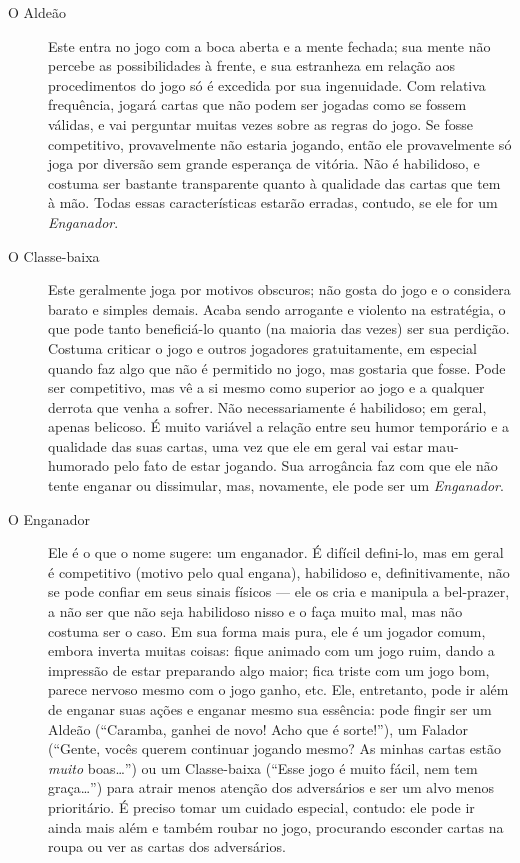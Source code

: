 \begin{description}
\item[O Aldeão]{Este entra no jogo com a boca aberta e a mente fechada; sua mente não percebe as possibilidades à frente, e sua estranheza em relação aos procedimentos do jogo só é excedida por sua ingenuidade. Com relativa frequência, jogará cartas que não podem ser jogadas como se fossem válidas, e vai perguntar muitas vezes sobre as regras do jogo. Se fosse competitivo, provavelmente não estaria jogando, então ele provavelmente só joga por diversão sem grande esperança de vitória. Não é habilidoso, e costuma ser bastante transparente quanto à qualidade das cartas que tem à mão. Todas essas características estarão erradas, contudo, se ele for um \textit{Enganador}.}
\item[O Classe-baixa]{Este geralmente joga por motivos obscuros; não gosta do jogo e o considera barato e simples demais. Acaba sendo arrogante e violento na estratégia, o que pode tanto beneficiá-lo quanto (na maioria das vezes) ser sua perdição. Costuma criticar o jogo e outros jogadores gratuitamente, em especial quando faz algo que não é permitido no jogo, mas gostaria que fosse. Pode ser competitivo, mas vê a si mesmo como superior ao jogo e a qualquer derrota que venha a sofrer. Não necessariamente é habilidoso; em geral, apenas belicoso. É muito variável a relação entre seu humor temporário e a qualidade das suas cartas, uma vez que ele em geral vai estar mau-humorado pelo fato de estar jogando. Sua arrogância faz com que ele não tente enganar ou dissimular, mas, novamente, ele pode ser um \textit{Enganador}.}
\item[O Enganador]{Ele é o que o nome sugere: um enganador. É difícil defini-lo, mas em geral é competitivo (motivo pelo qual engana), habilidoso e, definitivamente, não se pode confiar em seus sinais físicos --- ele os cria e manipula a bel-prazer, a não ser que não seja habilidoso nisso e o faça muito mal, mas não costuma ser o caso. Em sua forma mais pura, ele é um jogador comum, embora inverta muitas coisas: fique animado com um jogo ruim, dando a impressão de estar preparando algo maior; fica triste com um jogo bom, parece nervoso mesmo com o jogo ganho, etc. Ele, entretanto, pode ir além de enganar suas ações e enganar mesmo sua essência: pode fingir ser um Aldeão (``Caramba, ganhei de novo! Acho que é sorte!''), um Falador (``Gente, vocês querem continuar jogando mesmo? As minhas cartas estão \textit{muito} boas\ldots'') ou um Classe-baixa (``Esse jogo é muito fácil, nem tem graça\ldots'') para atrair menos atenção dos adversários e ser um alvo menos prioritário. É preciso tomar um cuidado especial, contudo: ele pode ir ainda mais além e também roubar no jogo, procurando esconder cartas na roupa ou ver as cartas dos adversários.}

\end{description}
